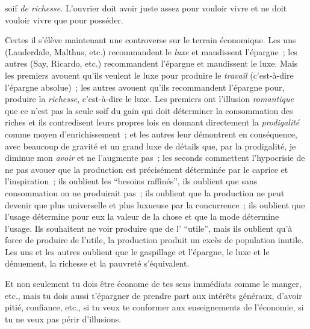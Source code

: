 \documentclass[french,twoside]{book} %
\begin{document}
soif \emph{de richesse.} L’ouvrier doit avoir juste assez pour vouloir vivre et ne doit vouloir vivre que pour posséder.\par
Certes il s’élève maintenant une controverse sur le terrain économique. Les uns (Lauderdale, Malthus, etc.) recommandent le \emph{luxe} et maudissent l’épargne ; les autres (Say, Ricardo, etc.) recommandent l’épargne et maudissent le luxe. Mais les premiers avouent qu’ils veulent le luxe pour produire le \emph{travail} (c’est-à-dire l’épargne absolue) ; les autres avouent qu’ils recommandent l’épargne pour, produire la \emph{richesse}, c’est-à-dire le luxe. Les premiers ont l’illusion \emph{romantique} que ce n’est pas la seule soif du gain qui doit déterminer la consommation des riches et ils contredisent leurs propres lois en donnant directement la \emph{prodigalité} comme moyen d’enrichissement ; et les autres leur démontrent en conséquence, avec beaucoup de gravité et un grand luxe de détails que, par la prodigalité, je diminue mon \emph{avoir} et ne l’augmente pas ; les seconds commettent l’hypocrisie de ne pas avouer que la production est précisément déterminée par le caprice et l’inspiration ; ils oublient les “besoins raffinés”, ils oublient que sans consommation on ne produirait pas ; ils oublient que la production ne peut devenir que plus universelle et plus luxueuse par la concurrence ; ils oublient que l’usage détermine pour eux la valeur de la chose et que la mode détermine l’usage. Ils souhaitent ne voir produire que de l’ “utile”, mais ils oublient qu’à force de produire de l’utile, la production produit un excès de population inutile. Les uns et les autres oublient que le gaspillage et l’épargne, le luxe et le dénuement, la richesse et la pauvreté s’équivalent.\par
Et non seulement tu dois être économe de tes sens immédiats comme le manger, etc., mais tu dois aussi t’épargner de prendre part aux intérêts généraux, d’avoir pitié, confiance, etc., si tu veux te conformer aux enseignements de l’économie, si tu ne veux pas périr d’illusions.\par
\end{document}
